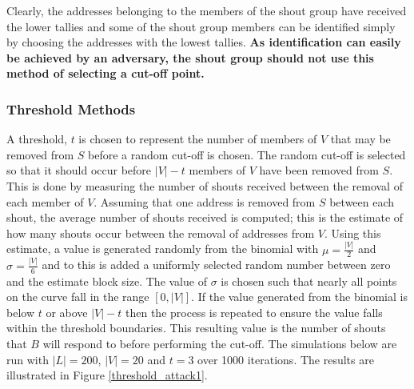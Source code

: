 \documentclass[ %
                    author={Luke Murray},
                supervisor={Dr. Simon Hollis},
                     title={Shadow Peer-to-Peer Networks},
                  subtitle={},
                    degree={MEng},
                      year={2013} ]{thesis}
\begin{document}
Clearly, the addresses belonging to the members of the shout group have received the lower tallies and some of the shout group members can be identified simply by choosing the addresses with the lowest tallies. \textbf{As identification can easily be achieved by an adversary, the shout group should not use this method of selecting a cut-off point.}

\subsubsection{Threshold Methods}

A threshold, $t$ is chosen to represent the number of members of $V$ that may be removed from $S$ before a random cut-off is chosen. The random cut-off is selected so that it should occur before $|V| - t$ members of $V$ have been removed from $S$. This is done by measuring the number of shouts received between the removal of each member of $V$. Assuming that one address is removed from $S$ between each shout, the average number of shouts received is computed; this is the estimate of how many shouts occur between the removal of addresses from $V$. Using this estimate, a value is generated randomly from the binomial with $\mu=\frac{|V|}{2}$ and $\sigma=\frac{|V|}{6}$ and to this is added a uniformly selected random number between zero and the estimate block size. The value of $\sigma$ is chosen such that nearly all points on the curve fall in the range $[0, |V|]$. If the value generated from the binomial is below $t$ or above $|V| - t$ then the process is repeated to ensure the value falls within the threshold boundaries. This resulting value is the number of shouts that $B$ will respond to before performing the cut-off. The simulations below are run with $|L| = 200$, $|V| = 20$ and $t = 3$ over 1000 iterations. The results are illustrated in Figure \ref{threshold_attack1}.
\end{document}
